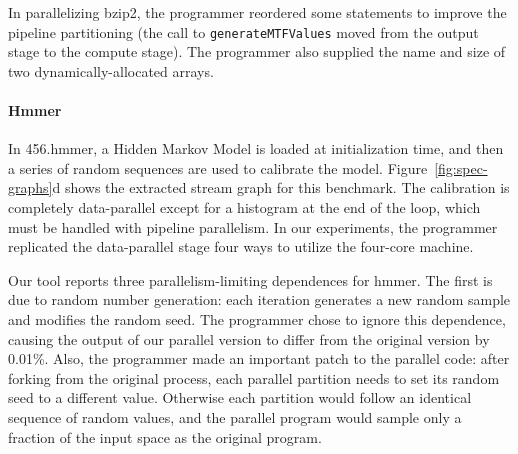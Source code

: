 In parallelizing bzip2, the programmer reordered some statements to
improve the pipeline partitioning (the call to {\tt generateMTFValues}
moved from the output stage to the compute stage).  The programmer
also supplied the name and size of two dynamically-allocated arrays.



\paragraph*{Hmmer} In 456.hmmer, a Hidden Markov Model is loaded at
initialization time, and then a series of random sequences are used to
calibrate the model.  Figure~\ref{fig:spec-graphs}d shows the
extracted stream graph for this benchmark.  The calibration is
completely data-parallel except for a histogram at the end of the
loop, which must be handled with pipeline parallelism.  In our
experiments, the programmer replicated the data-parallel stage four
ways to utilize the four-core machine.

Our tool reports three parallelism-limiting dependences for hmmer.
The first is due to random number generation: each iteration generates
a new random sample and modifies the random seed.  The programmer
chose to ignore this dependence, causing the output of our parallel
version to differ from the original version by 0.01\%.  Also, the
programmer made an important patch to the parallel code: after forking
from the original process, each parallel partition needs to set its
random seed to a different value.  Otherwise each partition would
follow an identical sequence of random values, and the parallel
program would sample only a fraction of the input space as the
original program.

